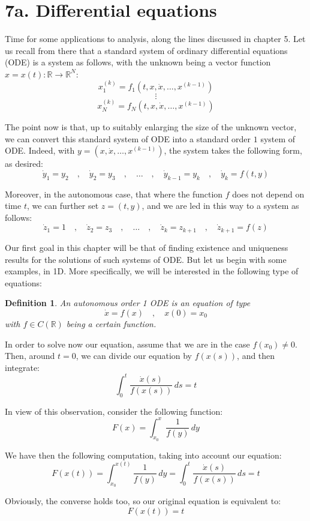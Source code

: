 \documentclass[12pt]{amsbook}
\newtheorem{definition}[theorem]{Definition}
\begin{document}
\section*{7a. Differential equations}

Time for some applications to analysis, along the lines discussed in chapter 5. Let us recall from there that a standard system of ordinary differential equations (ODE) is a system as follows, with the unknown being a vector function $x=x(t):\mathbb R\to\mathbb R^N$:
$$x_1^{(k)}=f_1(t,x,\dot{x},\ldots,x^{(k-1)})$$
$$\vdots$$
$$x_N^{(k)}=f_N(t,x,\dot{x},\ldots,x^{(k-1)})$$

The point now is that, up to suitably enlarging the size of the unknown vector, we can convert this standard system of ODE into a standard order $1$ system of ODE. Indeed, with $y=(x,\dot{x},\ldots,x^{(k-1)})$, the system takes the following form, as desired:
$$\dot{y}_1=y_2\quad,\quad 
\dot{y}_2=y_3\quad,\quad 
\ldots\quad,\quad 
\dot{y}_{k-1}=y_k\quad,\quad 
\dot{y}_k=f(t,y)$$

Moreover, in the autonomous case, that where the function $f$ does not depend on time $t$, we can further set $z=(t,y)$, and we are led in this way to a system as follows:
$$\dot{z}_1=1\quad,\quad 
\dot{z}_2=z_3\quad,\quad
\ldots\quad,\quad
\dot{z}_k=z_{k+1}\quad,\quad
\dot{z}_{k+1}=f(z)$$

Our first goal in this chapter will be that of finding existence and uniqueness results for the solutions of such systems of ODE. But let us begin with some examples, in 1D. More specifically, we will be interested in the following type of equations:

\begin{definition}
An autonomous order 1 ODE is an equation of type
$$\dot{x}=f(x)\quad,\quad x(0)=x_0$$
with $f\in C(\mathbb R)$ being a certain function.
\end{definition}

In order to solve now our equation, assume that we are in the case $f(x_0)\neq 0$. Then, around $t=0$, we can divide our equation by $f(x(s))$, and then integrate:
$$\int_0^t\frac{\dot{x}(s)}{f(x(s))}\,ds=t$$

In view of this observation, consider the following function:
$$F(x)=\int_{x_0}^x\frac{1}{f(y)}\,dy$$

We have then the following computation, taking into account our equation:
$$F(x(t))
=\int_{x_0}^{x(t)}\frac{1}{f(y)}\,dy
=\int_0^t\frac{\dot{x}(s)}{f(x(s))}\,ds
=t$$

Obviously, the converse holds too, so our original equation is equivalent to:
$$F(x(t))=t$$
\end{document}
